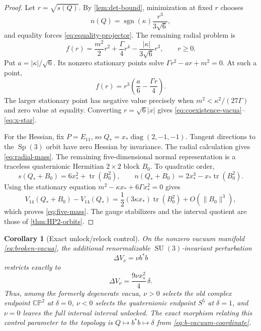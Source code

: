\documentclass[11pt]{article}
\newtheorem{corollary}[theorem]{Corollary}
\theoremstyle{definition}
\theoremstyle{remark}
\newcommand{\CP}{\mathbb{CP}}
\newcommand{\tr}{\operatorname{tr}}
\newcommand{\diag}{\operatorname{diag}}
\newcommand{\Sp}{\operatorname{Sp}}
\newcommand{\SU}{\operatorname{SU}}
\begin{document}
\begin{proof}
Let $r=\sqrt{s(Q)}$.  By \cref{lem:det-bound}, minimization at fixed $r$
chooses
\[
 n(Q)=\operatorname{sgn}(\kappa)\frac{r^3}{3\sqrt6},
\]
and equality forces \eqref{eq:equality-projector}.  The remaining radial
problem is
\[
 f(r)=\frac{m^2}{2}r^2+\frac{\Gamma}{4}r^4
      -\frac{|\kappa|}{3\sqrt6}r^3,
 \qquad r\geq0.
\]
Put $a=|\kappa|/\sqrt6$.  Its nonzero stationary points solve
$\Gamma r^2-ar+m^2=0$.  At such a point,
\[
 f(r)=r^3\left(\frac a6-\frac{\Gamma r}{4}\right).
\]
The larger stationary point has negative value precisely when
$m^2<\kappa^2/(27\Gamma)$ and zero value at equality.  Converting
$r=\sqrt6|x|$ gives \eqref{eq:coexistence-vacua}--\eqref{eq:x-star}.

For the Hessian, fix $P=E_{11}$, so
$Q_*=x_*\diag(2,-1,-1)$.  Tangent directions to the $\Sp(3)$ orbit have zero
Hessian by invariance.  The radial calculation gives
\eqref{eq:radial-mass}.  The remaining five-dimensional normal representation
is a traceless quaternionic Hermitian $2\times2$ block $B_0$.  To quadratic
order,
\[
 s(Q_*+B_0)=6x_*^2+\tr(B_0^2),
 \qquad
 n(Q_*+B_0)=2x_*^3-x_*\tr(B_0^2).
\]
Using the stationary equation
$m^2-\kappa x_*+6\Gamma x_*^2=0$ gives
\[
 V_{14}(Q_*+B_0)-V_{14}(Q_*)
 =\frac12(3\kappa x_*)\tr(B_0^2)+O(\|B_0\|^3),
\]
which proves \eqref{eq:five-mass}.  The gauge stabilizers and the interval
quotient are those of \cref{thm:HP2-orbits}.
\end{proof}

\begin{corollary}[Exact unlock/relock control]\label{cor:unlock-control}
On the nonzero vacuum manifold \eqref{eq:broken-vacua}, the additional
renormalizable $\SU(3)$-invariant perturbation
\begin{equation}\label{eq:nu-perturbation}
 \Delta V_\nu=\nu b^*b
\end{equation}
restricts exactly to
\begin{equation}\label{eq:nu-on-vacuum}
 \boxed{
 \Delta V_\nu
 =\frac{9\nu x_*^2}{4}\,\delta.}
\end{equation}
Thus, among the formerly degenerate vacua, $\nu>0$ selects the old complex
endpoint $\CP^2$ at $\delta=0$, $\nu<0$ selects the quaternionic endpoint
$S^5$ at $\delta=1$, and $\nu=0$ leaves the full internal interval unlocked.
The exact morphism relating this control parameter to the topology is
$Q\mapsto b^*b\mapsto\delta$ from
\eqref{eq:b-vacuum-coordinate}.
\end{corollary}
\end{document}
